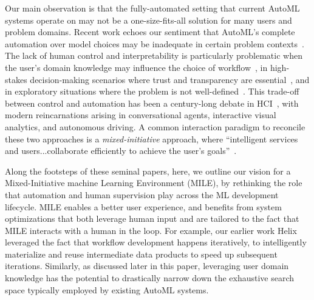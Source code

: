 \documentclass[11pt,dvipdfmx]{article}
\newcommand{\system}{{\sf MILE}\xspace}
\newcommand{\helix}{{\sc Helix}\xspace}
\begin{document}
\par Our main observation is that the fully-automated setting that current AutoML systems operate on may not be a one-size-fits-all solution for many users and problem domains. Recent work echoes our sentiment that AutoML's complete automation over model choices may be inadequate in certain problem contexts~\cite{Gil2019,Wang2019}. The lack of human control and interpretability is particularly problematic when the user's domain knowledge may influence the choice of workflow~\cite{Gil2019}, in high-stakes decision-making scenarios where trust and transparency are essential~\cite{Wang2019}, and in exploratory situations where the problem is not well-defined~\cite{Cashman2018}. This trade-off between control and automation has been a century-long debate in HCI~\cite{Horvitz1999,Heer2019,Shneiderman1997,Amershi2019AI}, with modern reincarnations arising in conversational agents, interactive visual analytics, and autonomous driving. A common interaction paradigm to reconcile these two approaches is a {\em mixed-initiative} approach, where ``intelligent services and users...collaborate efficiently to achieve the user's goals''~\cite{Horvitz1999}.
\par Along the footsteps of these seminal papers, here, we outline our vision for a Mixed-Initiative machine Learning Environment (\system), by rethinking the role that automation and human supervision play across the ML development lifecycle. \system enables a better user experience, and benefits from system optimizations that both leverage human input and are tailored to the fact that \system interacts with a human in the loop. For example, our earlier work \helix~\cite{xin2018helix} leveraged the fact that workflow development happens iteratively, to intelligently materialize and reuse intermediate data products to speed up subsequent iterations. Similarly, as discussed later in this paper, leveraging user domain knowledge has the potential to drastically narrow down the exhaustive search space typically employed by existing AutoML systems. 
\newpage
\end{document}
